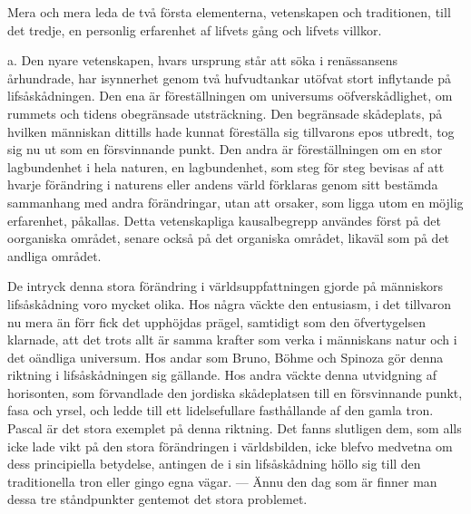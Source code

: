 \documentclass[12pt]{article}
\newcommand{\opage}[1]{\marginnote{\footnotesize\textit{[#1]}}}
\begin{document}
Mera och mera leda de två första elementerna, vetenskapen och traditionen, till det tredje, en personlig erfarenhet af lifvets gång och lifvets villkor.

a. Den nyare vetenskapen, hvars ursprung står att söka i renässansens århundrade, har isynnerhet genom två hufvudtankar utöfvat stort inflytande på lifsåskådningen. Den ena är föreställningen om universums oöfverskådlighet, om rummets och tidens obegränsade utsträckning. Den begränsade skådeplats, på hvilken människan dittills hade kunnat föreställa sig tillvarons epos utbredt, tog sig nu ut som en försvinnande punkt. Den andra är föreställningen om en stor lagbundenhet i hela naturen, en lagbundenhet, som steg för steg bevisas af att hvarje förändring i naturens eller andens värld förklaras genom sitt bestämda sammanhang med andra förändringar, utan att orsaker, som ligga utom en möjlig erfarenhet, påkallas. Detta vetenskapliga kausalbegrepp användes först på det oorganiska området, senare också på det %
\opage{62}
organiska området, likaväl som på det andliga området.

De intryck denna stora förändring i världsuppfattningen gjorde på människors lifsåskådning voro mycket olika. Hos några väckte den entusiasm, i det tillvaron nu mera än förr fick det upphöjdas prägel, samtidigt som den öfvertygelsen klarnade, att det trots allt är samma krafter som verka i människans natur och i det oändliga universum. Hos andar som Bruno, Böhme och Spinoza gör denna riktning i lifsåskådningen sig gällande. Hos andra väckte denna utvidgning af horisonten, som förvandlade den jordiska skådeplatsen till en försvinnande punkt, fasa och yrsel, och ledde till ett lidelsefullare fasthållande af den gamla tron. Pascal är det stora exemplet på denna riktning. Det fanns slutligen dem, som alls icke lade vikt på den stora förändringen i världsbilden, icke blefvo medvetna om dess principiella betydelse, antingen de i sin lifsåskådning höllo sig till den traditionella tron eller gingo egna vägar. --- Ännu den dag som är finner man dessa tre ståndpunkter gentemot det stora problemet.
\end{document}

